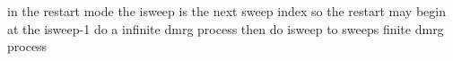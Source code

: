 in the restart mode
the isweep is the next sweep index
so the restart may begin at the isweep-1 do a infinite dmrg process 
then do isweep to sweeps finite dmrg process
